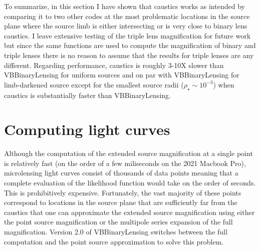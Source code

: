 \documentclass[12pt,dvipsnames]{report}
\newcommand{\ssf}[1]{\textsf{#1}}
\begin{document}
To summarize, in this section I have shown that \ssf{caustics} works as intended by comparing 
it to two other codes at the most problematic locations in the source plane where the source 
limb is either intersecting or is very close to binary lens caustics. I leave extensive 
testing of the triple lens magnification for future work but since the same functions are used 
to compute the magnification of binary and triple lenses there is no reason to assume that 
the results for triple lenses are any different. Regarding performance, \ssf{caustics} is 
roughly 3-10X slower than \ssf{VBBinaryLensing} for uniform sources and on par with
\ssf{VBBinaryLensing} for limb-darkened source except for the smallest source radii 
($\rho_\star\sim 10^{-3}$) when \ssf{caustics} is substantially faster than 
\ssf{VBBinaryLensing}. 

\section{Computing light curves}
Although the computation of the extended source magnification at a single point is relatively
fast (on the order of a few miliseconds on the 2021 Macbook Pro), microlensing light curves 
consist of thousands of data points meaning that a complete evaluation of the likelihood 
function would take on the order of seconds. This is prohibitively expensive. Fortunately, 
the vast majority of these points correspond to locations in the source plane that are 
sufficiently far from the caustics that one can approximate the extended source magnification 
using either the point source magnification or the multipole series expansion of the 
full magnification. Version 2.0 
of \ssf{VBBinaryLensing} \citep{2018MNRAS.479.5157B} switches between the full computation 
and the point source approximation to solve this problem.
\end{document}
